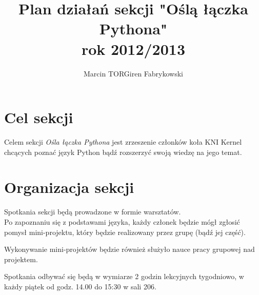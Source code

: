 \documentclass[a4paper,12pt]{article}
\title{Plan działań sekcji "Oślą łączka Pythona"\\rok 2012/2013}
\author{Marcin TORGiren Fabrykowski}
\begin{document}
\maketitle
\newpage
\section{Cel sekcji}
Celem sekcji \textit{Ośla łączka Pythona} jest zrzeszenie członków koła KNI Kernel chcących poznać język Python bądź rozszerzyć swoją wiedzę na jego temat.
\section{Organizacja sekcji}
Spotkania sekcji będą prowadzone w formie warsztatów.\\
Po zapoznaniu się z podstawami języka, każdy członek będzie mógł zgłosić pomysł mini-projektu, który będzie realizowany przez grupę (bądź jej część).

Wykonywanie mini-projektów będzie również służyło nauce pracy grupowej nad projektem.

Spotkania odbywać się będą w wymiarze 2 godzin lekcyjnych tygodniowo, w każdy piątek od godz. 14.00 do 15:30 w sali 206.
\end{document}
